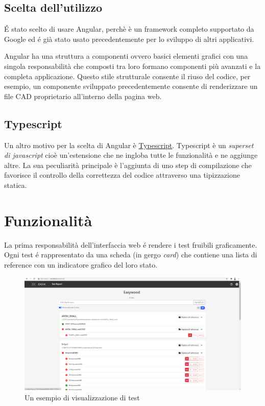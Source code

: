         \subsection{Scelta dell'utilizzo}
            \'E stato scelto di usare Angular, perchè è un framework completo supportato da Google
            ed \'e già stato usato precedentemente per lo sviluppo di altri applicativi.
            
            Angular ha una struttura a componenti ovvero basici elementi grafici con una singola responsabilità che composti tra loro formano componenti più avanzati e la completa applicazione.
            Questo stile strutturale consente il riuso del codice, per esempio, un componente sviluppato precedentemente consente
            di renderizzare un file CAD proprietario all'interno della pagina web.
        
        \subsection{Typescript}
            Un altro motivo per la scelta di Angular è \href{https://www.typescriptlang.org}{Typescript}.
            Typescript è un \textit{superset di javascript} cioè un'estensione che ne ingloba tutte le funzionalità e ne aggiunge altre.
            La sua peculiarità principale è l'aggiunta di uno step di compilazione che favorisce il controllo della correttezza del codice attraverso una tipizzazione statica.
    \section{Funzionalità}
        La prima responsabilità dell'interfaccia web \'e rendere i test fruibili graficamente.
        Ogni test \'e rappresentato da una scheda (in gergo \textit{card}) che contiene una lista di reference con un indicatore grafico del loro stato.
        \begin{figure}[h]
            \includegraphics[width=\textwidth]{images/page.png}
            \caption{Un esempio di visualizzazione di test}
        \end{figure}

